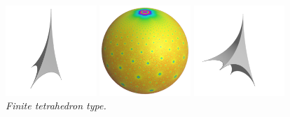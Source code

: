 \begin{figure}[H]
 \begin{minipage}{0.5\textwidth}
  \begin{minipage}[t]{0.24\textwidth}
   \centering
   \includegraphics[width=1.35in, height=1.35in, keepaspectratio]{./img/application/sphairahedron/variations/tetrahedron/sphairahedron.pdf}
  \end{minipage}
  \hspace*{\fill}
  \begin{minipage}[t]{0.24\textwidth}
   \centering
   \includegraphics[width=1.35in, height=1.35in, keepaspectratio]{./img/application/sphairahedron/variations/tetrahedron/limitset2.png}
  \end{minipage}
  \hspace*{\fill}
  \caption{\textit{Finite tetrahedron type.}}
  \label{fig:tetrahedron}
 \end{minipage}
 \hspace*{\fill}
 \begin{minipage}{0.5\textwidth}
  \begin{minipage}[t]{0.24\textwidth}
   \centering
   \includegraphics[width=1.35in, height=1.35in, keepaspectratio]{./img/application/sphairahedron/variations/pentahedralPyramid/sphairahedron.pdf}
  \end{minipage}

\end{minipage}
\end{figure}
